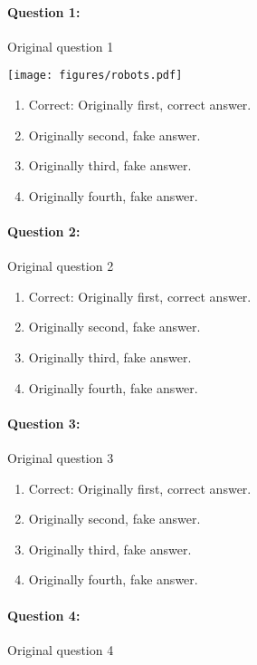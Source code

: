\documentclass[9pt, twoside, twocolumn]{extarticle}
\renewcommand{\includegraphics}[2][]{\OldIncludegraphics[width=\linewidth, #1]{#2}}
\renewcommand{\caption}{}
\let\origfigure=\figure
\let\endorigfigure=\endfigure
\renewenvironment{figure}[1][]{%
  \origfigure[H]
}{%
  \endorigfigure
}
\begin{document}
\paragraph{Question 1:}
Original question 1

\begin{figure}\centering
\texttt{[image: figures/robots.pdf]}
\caption{\end{figure}
\begin{enumerate}[label=\textbf{{\Alph*}},labelindent=0pt, labelsep=1.5em, parsep=0.2em]
\item Correct: Originally first, correct answer.
\item Originally second, fake answer.
\item Originally third, fake answer.
\item Originally fourth, fake answer.
\end{enumerate}
\paragraph{Question 2:}
Original question 2

\begin{enumerate}[label=\textbf{{\Alph*}},labelindent=0pt, labelsep=1.5em, parsep=0.2em]
\item Correct: Originally first, correct answer.
\item Originally second, fake answer.
\item Originally third, fake answer.
\item Originally fourth, fake answer.
\end{enumerate}
\paragraph{Question 3:}
Original question 3

\begin{enumerate}[label=\textbf{{\Alph*}},labelindent=0pt, labelsep=1.5em, parsep=0.2em]
\item Correct: Originally first, correct answer.
\item Originally second, fake answer.
\item Originally third, fake answer.
\item Originally fourth, fake answer.
\end{enumerate}
\paragraph{Question 4:}
Original question 4
\end{document}
